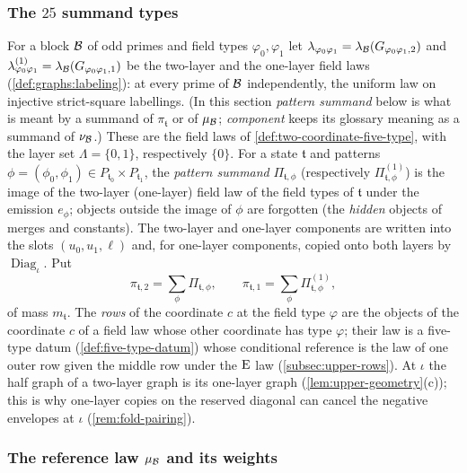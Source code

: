 \subsubsection{The \texorpdfstring{$25$}{25} summand types}\label{subsec:layer72:upper}
For a block $\mathcal B$ of odd primes and field types $\varphi_0,\varphi_1$ let
$\lambda_{\varphi_0\varphi_1}=\lambda_\mathcal B(G_{\varphi_0\varphi_1,2})$ and
$\lambda^{(1)}_{\varphi_0\varphi_1}=\lambda_\mathcal B(G_{\varphi_0\varphi_1,1})$ be the
two-layer and the one-layer field laws (\cref{def:graphs:labeling}): at every
prime of $\mathcal B$ independently, the uniform law on injective strict-square
labellings. (In this section \emph{pattern summand} below is
what is meant by a summand of $\pi_{\mathfrak t}$ or of
$\mu_\mathcal B$; \emph{component} keeps its glossary meaning as a
summand of $\nu_\mathcal B$.) These are the field laws of
\cref{def:two-coordinate-five-type},
with the layer set $\Lambda=\{0,1\}$, respectively $\{0\}$. For a state
$\mathfrak t$ and patterns $\phi=(\phi_0,\phi_1)\in P_{\mathfrak t_0}\times
P_{\mathfrak t_1}$, the \emph{pattern summand} $\Pi_{\mathfrak t,\phi}$ (respectively
$\Pi^{(1)}_{\mathfrak t,\phi}$) is the image of the two-layer (one-layer) field
law of the field types of $\mathfrak t$ under the emission $e_\phi$; objects
outside the image of $\phi$ are forgotten (the \emph{hidden} objects of merges
and constants). The two-layer and one-layer components are written into the
slots $(u_0,u_1,\ell)$ and, for one-layer components, copied onto both layers by
$\operatorname{Diag}_\iota$. Put
\[
 \pi_{\mathfrak t,2}=\sum_\phi\Pi_{\mathfrak t,\phi},\qquad
 \pi_{\mathfrak t,1}=\sum_\phi\Pi^{(1)}_{\mathfrak t,\phi},
\]
of mass $m_{\mathfrak t}$. The \emph{rows} of the coordinate $c$ at the field
type $\varphi$ are the objects of the coordinate $c$ of a field law whose other
coordinate has type $\varphi$; their law is a five-type datum
(\cref{def:five-type-datum}) whose conditional reference is the law of one outer
row given the middle row under the $\rm E$ law (\cref{subsec:upper-rows}). At
$\iota$ the half graph of a two-layer graph is its one-layer graph
(\cref{lem:upper-geometry}(c)); this is why one-layer copies on the reserved
diagonal can cancel the negative envelopes at $\iota$ (\cref{rem:fold-pairing}).

\subsubsection{The reference law \texorpdfstring{$\mu_\mathcal B$}{mu\_B} and its weights}\label{subsec:independent-fold-weights}

